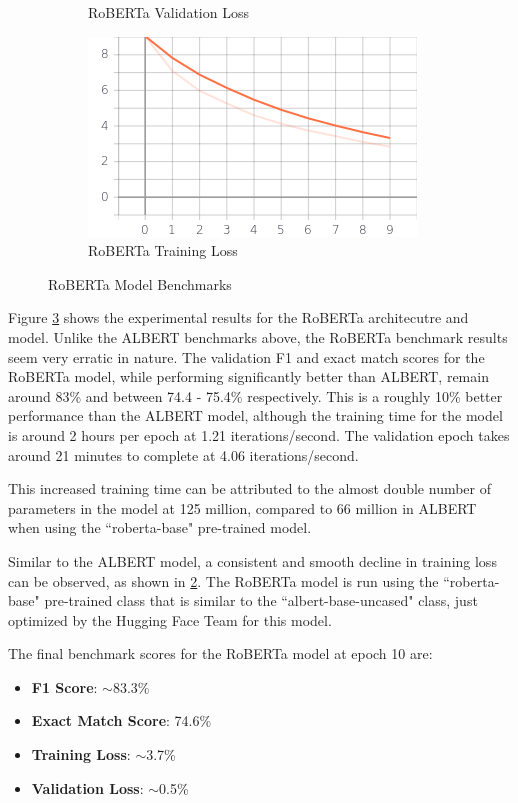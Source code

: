 \documentclass[a4paper,12pt]{report}
\begin{document}
\begin{figure}
\begin{subfigure}[b]{0.4\textwidth}
		\caption{\small RoBERTa Validation Loss}
		\label{robertaValLoss}
	\end{subfigure}
	\hfill
	\begin{subfigure}[b]{0.4\textwidth}
		\centering
		\includegraphics[width=\textwidth]{../images/Roberta_Train_Loss.png}
		\caption{\small RoBERTa Training Loss}
		\label{robertaTrainloss}
	\end{subfigure}
	\caption{RoBERTa Model Benchmarks}
	\label{robertaBenchmarks}
\end{figure}

	Figure \ref{robertaBenchmarks} shows the experimental results for the RoBERTa architecutre and model. Unlike the ALBERT benchmarks above, the RoBERTa benchmark results seem very erratic in nature. The validation F1 and exact match scores for the RoBERTa model, while performing significantly better than ALBERT, remain around 83\% and between 74.4 - 75.4\% respectively. This is a roughly 10\% better performance than the ALBERT model, although the training time for the model is around 2 hours per epoch at 1.21 iterations/second. The validation epoch takes around 21 minutes to complete at 4.06 iterations/second.

	This increased training time can be attributed to the almost double number of parameters in the model at 125 million, compared to 66 million in ALBERT when using the ``roberta-base" pre-trained model.

	Similar to the ALBERT model, a consistent and smooth decline in training loss can be observed, as shown in \ref{robertaTrainloss}. The RoBERTa model is run using the ``roberta-base" pre-trained class that is similar to the ``albert-base-uncased" class, just optimized by the Hugging Face Team for this model.

	The final benchmark scores for the RoBERTa model at epoch 10 are:
	\begin{itemize}
		\item \textbf{F1 Score}:  $\sim$83.3\%
		\item \textbf{Exact Match Score}: 74.6\%
		\item \textbf{Training Loss}:  $\sim$3.7\%
		\item \textbf{Validation Loss}: $\sim$0.5\%
	\end{itemize}
\end{document}
